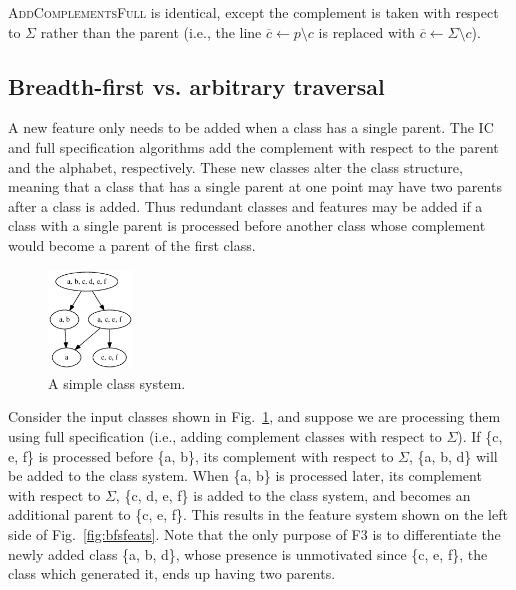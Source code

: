 \documentclass[12pt, oneside]{article}   	%
\begin{document}
\noindent \textsc{AddComplementsFull} is identical, except the complement is taken with respect to $\Sigma$ rather than the parent (i.e., the line $\overline{c} \leftarrow p \setminus c$ is replaced with $\overline{c} \leftarrow \Sigma \setminus c$).

\subsection{Breadth-first vs. arbitrary traversal}
\label{app:bfs}

A new feature only needs to be added when a class has a single parent. The IC and full specification algorithms add the complement with respect to the parent and the alphabet, respectively. These new classes alter the class structure, meaning that a class that has a single parent at one point may have two parents after a class is added. Thus redundant classes and features may be added if a class with a single parent is processed before another class whose complement would become a parent of the first class.

\begin{figure}[htb!]
	\centering
	\includegraphics[width=0.2\textwidth]{bfs1.png}
	\caption{A simple class system.}
	\label{fig:bfs1}
\end{figure}

Consider the input classes shown in Fig.~\ref{fig:bfs1}, and suppose we are processing them using full specification (i.e., adding complement classes with respect to $\Sigma$). If \{c, e, f\} is processed before \{a, b\}, its complement with respect to $\Sigma$, \{a, b, d\} will be added to the class system. When \{a, b\} is processed later, its complement with respect to $\Sigma$, \{c, d, e, f\} is added to the class system, and becomes an additional parent to \{c, e, f\}. This results in the feature system shown on the left side of Fig.~\ref{fig:bfsfeats}. Note that the only purpose of F3 is to differentiate the newly added class \{a, b, d\}, whose presence is unmotivated since \{c, e, f\}, the class which generated it, ends up having two parents.
\end{document}

